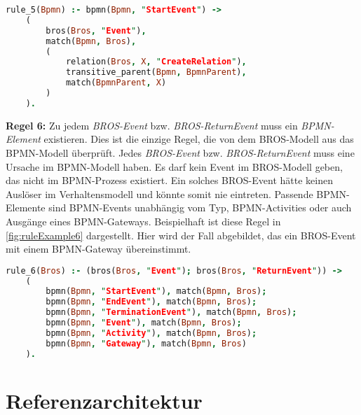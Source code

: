 \begin{lstlisting}[language=Prolog, caption=Formalisierung der Regel 5, label=lst:rule_5]
rule_5(Bpmn) :- bpmn(Bpmn, "StartEvent") ->
    (
        bros(Bros, "Event"),
        match(Bpmn, Bros),
        (
            relation(Bros, X, "CreateRelation"),
            transitive_parent(Bpmn, BpmnParent),
            match(BpmnParent, X)
        )
    ).
\end{lstlisting}

\textbf{Regel 6:}
Zu jedem \emph{BROS-Event} bzw. \emph{BROS-ReturnEvent} muss ein \emph{BPMN-Element} existieren.
Dies ist die einzige Regel, die von dem BROS-Modell aus das BPMN-Modell überprüft.
Jedes \emph{BROS-Event} bzw. \emph{BROS-ReturnEvent} muss eine Ursache im BPMN-Modell haben.
Es darf kein Event im BROS-Modell geben, das nicht im BPMN-Prozess existiert.
Ein solches BROS-Event hätte keinen Auslöser im Verhaltensmodell und könnte somit nie eintreten.
Passende BPMN-Elemente sind BPMN-Events unabhängig vom Typ, BPMN-Activities oder auch Ausgänge eines BPMN-Gateways.
Beispielhaft ist diese Regel in \cref{fig:ruleExample6} dargestellt.
Hier wird der Fall abgebildet, das ein BROS-Event mit einem BPMN-Gateway übereinstimmt.

\begin{lstlisting}[language=Prolog, caption=Formalisierung der Regel 6, label=lst:rule_6]
rule_6(Bros) :- (bros(Bros, "Event"); bros(Bros, "ReturnEvent")) ->
    (
        bpmn(Bpmn, "StartEvent"), match(Bpmn, Bros);
        bpmn(Bpmn, "EndEvent"), match(Bpmn, Bros);
        bpmn(Bpmn, "TerminationEvent"), match(Bpmn, Bros);
        bpmn(Bpmn, "Event"), match(Bpmn, Bros);
        bpmn(Bpmn, "Activity"), match(Bpmn, Bros);
        bpmn(Bpmn, "Gateway"), match(Bpmn, Bros)
    ).
\end{lstlisting}

\section{Referenzarchitektur}


